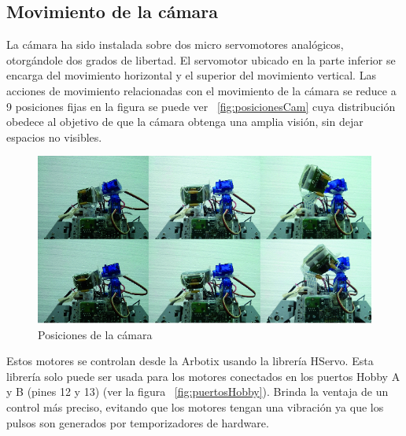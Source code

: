 \subsection{Movimiento de la cámara}
La cámara ha sido instalada sobre dos micro servomotores analógicos, otorgándole dos grados de libertad. El servomotor ubicado en la parte inferior se encarga del movimiento horizontal y el superior del movimiento vertical. Las acciones de movimiento relacionadas con el movimiento de la cámara se reduce a 9 posiciones fijas en la figura se puede ver ~\ref{fig:posicionesCam} cuya distribución obedece al objetivo de que la cámara obtenga una amplia visión, sin dejar espacios no visibles. 



\begin{figure}[hbtp]
\label{posicionesCam}
\centering
\includegraphics[scale=0.5]{imagenes/Pantallazo.png}
\caption{Posiciones de la cámara  }
\end{figure}

Estos motores se controlan desde la Arbotix usando la librería HServo. Esta librería solo puede ser usada para los motores conectados en los puertos Hobby A y B (pines 12 y 13) (ver la figura ~\ref{fig:puertosHobby}). Brinda la ventaja de un control más preciso, evitando que los motores tengan una vibración ya que los pulsos son generados por temporizadores de hardware. 

